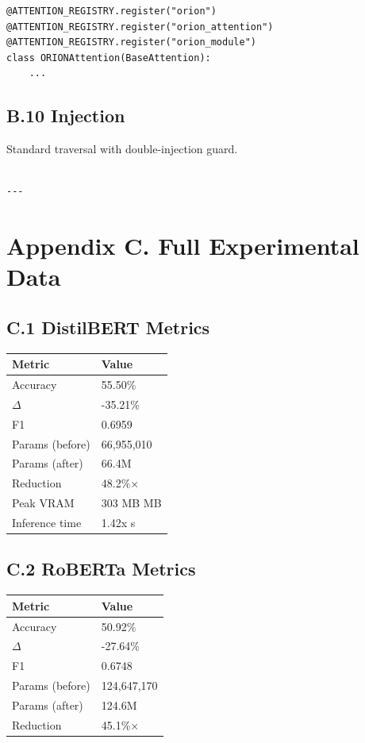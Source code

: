 \begin{lstlisting}
@ATTENTION_REGISTRY.register("orion")
@ATTENTION_REGISTRY.register("orion_attention")
@ATTENTION_REGISTRY.register("orion_module")
class ORIONAttention(BaseAttention):
    ...
\end{lstlisting}

\subsection{B.10 Injection}

Standard traversal with double-injection guard.
\begin{lstlisting}

---
\end{lstlisting}


\section{Appendix C. Full Experimental Data}

\subsection{C.1 DistilBERT Metrics}

\begin{table}[H]
\centering
\small
\begin{tabular}{ll}
\toprule
\textbf{Metric} & \textbf{Value} \\
\midrule
Accuracy & 55.50\% \\
$\Delta$ & -35.21\% \\
F1 & 0.6959 \\
Params (before) & 66,955,010 \\
Params (after) & 66.4M \\
Reduction & 48.2\%$\times$ \\
Peak VRAM & 303 MB MB \\
Inference time & 1.42x s \\
\bottomrule
\end{tabular}
\end{table}

\subsection{C.2 RoBERTa Metrics}

\begin{table}[H]
\centering
\small
\begin{tabular}{ll}
\toprule
\textbf{Metric} & \textbf{Value} \\
\midrule
Accuracy & 50.92\% \\
$\Delta$ & -27.64\% \\
F1 & 0.6748 \\
Params (before) & 124,647,170 \\
Params (after) & 124.6M \\
Reduction & 45.1\%$\times$ \\
\bottomrule
\end{tabular}
\end{table}

